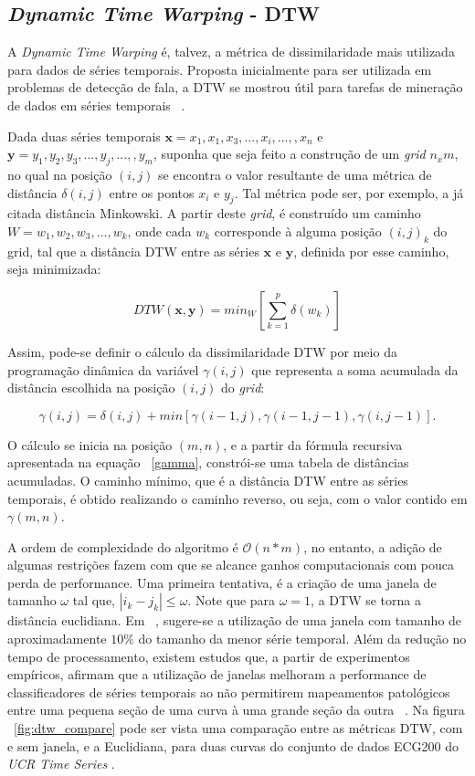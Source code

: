 \subsection{\emph{Dynamic Time Warping} - DTW}

A \emph{Dynamic Time Warping} é, talvez, a métrica de dissimilaridade mais utilizada para dados de séries temporais. Proposta inicialmente para ser utilizada em problemas de detecção de fala, a DTW se mostrou útil para tarefas de mineração de dados em séries temporais ~\parencite{DTW}.

Dada duas séries temporais $\bm{x} = x_1,x_1,x_3,...,x_i,...,,x_n$ e $\bm{y} = y_1,y_2,y_3,...,y_j,...,,y_m$, suponha que seja feito a construção de um \emph{grid} $n_{x}m$, no qual na posição $(i,j)$ se encontra o valor resultante de uma métrica de distância $\delta(i,j)$ entre os pontos $x_i$ e $y_j$. Tal métrica pode ser, por exemplo, a já citada distância Minkowski. A partir deste \emph{grid}, é construído um caminho $W=w_1,w_2,w_3,...,w_k$, onde cada $w_k$ corresponde à alguma posição $(i,j)_k$ do grid, tal que a distância DTW entre as séries $\bm{x}$ e $\bm{y}$, definida por esse caminho, seja minimizada:

\begin{equation}
DTW(\bm{x},\bm{y}) = min_W[\sum_{k=1}^{p}\delta(w_k)]
\end{equation}

Assim, pode-se definir o cálculo da dissimilaridade DTW por meio da programação dinâmica da variável $\gamma(i,j)$ que representa a soma acumulada da distância escolhida na posição $(i,j)$ do \emph{grid}:

\begin{equation} \label{gamma}
\gamma(i,j) = \delta(i,j) + min[\gamma(i-1,j),\gamma(i-1,j-1),\gamma(i,j-1)].
\end{equation}

O cálculo se inicia na posição $(m,n)$, e a partir da fórmula recursiva apresentada na equação ~\ref{gamma}, constrói-se uma tabela de distâncias acumuladas. O caminho mínimo, que é a distância DTW entre as séries temporais, é obtido realizando o caminho reverso, ou seja, com o valor contido em $\gamma(m,n)$.

A ordem de complexidade do algoritmo é $\mathcal{O}(n*m)$, no entanto, a adição de algumas restrições fazem com que se alcance ganhos computacionais com pouca perda de performance. Uma primeira tentativa, é a criação de uma janela de tamanho $\omega$ tal que, $|i_k-j_k| \leq \omega$. Note que para $\omega=1$, a DTW se torna a distância euclidiana. Em ~\parencite{BatistaComparativo}, sugere-se a utilização de uma janela com tamanho de aproximadamente $10\%$ do tamanho da menor série temporal. Além da redução no tempo de processamento, existem estudos que, a partir de experimentos empíricos, afirmam que a utilização de janelas melhoram a performance de classificadores de séries temporais ao não permitirem mapeamentos patológicos entre uma pequena seção de uma curva à uma grande seção da outra ~\parencite{LB_Keogh}. Na figura ~\ref{fig:dtw_compare} pode ser vista uma comparação entre as métricas DTW, com e sem janela, e a Euclidiana, para duas curvas do conjunto de dados ECG200 do \emph{UCR Time Series} \parencite{UCRArchive}.

